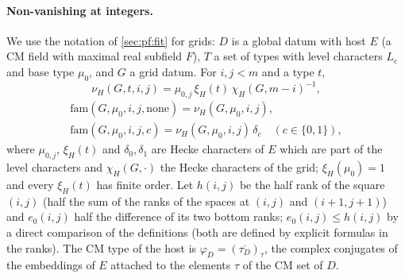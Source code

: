 \paragraph{Non-vanishing at integers.}
We use the notation of \cref{sec:pf:fit} for grids: $D$ is a global datum with host $E$ (a CM field with maximal real subfield
$F$), $T$ a set of types with level characters $L_c$ and base type $\mu_0$, and $G$ a grid datum. For $i,j<m$ and a type $t$,
\[
\nu_H(G,t,i,j)=\mu_{0,j}\,\xi_H(t)\,\chi_H(G,m-i)^{-1},
\]
\begin{gather*}
\mathrm{fam}(G,\mu_0,i,j,\mathrm{none})=\nu_H(G,\mu_0,i,j),\\
\mathrm{fam}(G,\mu_0,i,j,c)=\nu_H(G,\mu_0,i,j)\,\delta_c\quad(c\in\{0,1\}),
\end{gather*}
where $\mu_{0,j}$, $\xi_H(t)$ and $\delta_0,\delta_1$ are Hecke characters of $E$ which are part of the level characters and
$\chi_H(G,\cdot)$ the Hecke characters of the grid; $\xi_H(\mu_0)=1$ and every $\xi_H(t)$ has finite order. Let $h(i,j)$ be the half
rank of the square $(i,j)$ (half the sum of the ranks of the spaces at $(i,j)$ and $(i+1,j+1)$) and $e_0(i,j)$ half the
difference of its two bottom ranks; $e_0(i,j)\le h(i,j)$ by a direct comparison of the definitions
(both are defined by explicit formulas in the ranks). The CM type of the host is
$\varphi_D=(\overline{\tau_D})_\tau$, the complex conjugates of the embeddings of $E$ attached to the elements $\tau$ of the CM set
of $D$.

